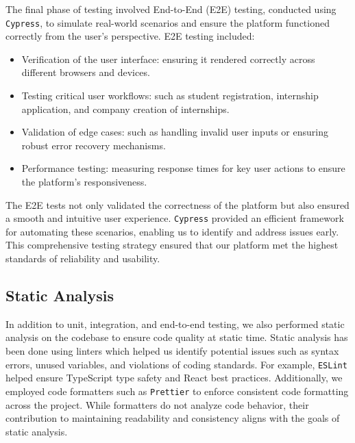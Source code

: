 The final phase of testing involved End-to-End (E2E) testing, conducted using \texttt{Cypress}, to simulate real-world scenarios and ensure the platform functioned correctly from the user's perspective. E2E testing included:
\begin{itemize}
    \item Verification of the user interface: ensuring it rendered correctly across different browsers and devices.
    \item Testing critical user workflows: such as student registration, internship application, and company creation of internships.
    \item Validation of edge cases: such as handling invalid user inputs or ensuring robust error recovery mechanisms.
    \item Performance testing: measuring response times for key user actions to ensure the platform's responsiveness.
\end{itemize}

The E2E tests not only validated the correctness of the platform but also ensured a smooth and intuitive user experience. \texttt{Cypress} provided an efficient framework for automating these scenarios, enabling us to identify and address issues early. This comprehensive testing strategy ensured that our platform met the highest standards of reliability and usability.


\subsection{Static Analysis}
In addition to unit, integration, and end-to-end testing, we also performed static analysis on the codebase to ensure code quality at static time. Static analysis has been done using linters which helped us identify potential issues such as syntax errors, unused variables, and violations of coding standards. For example, \texttt{ESLint} helped ensure TypeScript type safety and React best practices. Additionally, we employed code formatters such as \texttt{Prettier} to enforce consistent code formatting across the project. While formatters do not analyze code behavior, their contribution to maintaining readability and consistency aligns with the goals of static analysis.
